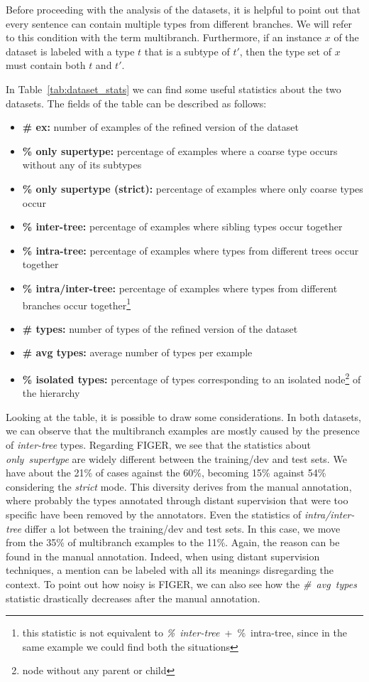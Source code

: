Before proceeding with the analysis of the datasets, it is helpful to point out that every sentence can contain multiple types from different branches. We will refer to this condition with the term multibranch. Furthermore, if an instance $x$ of the dataset is labeled with a type $t$ that is a subtype of $t'$, then the type set of $x$ must contain both $t$ and $t'$.

In Table~\ref{tab:dataset_stats} we can find some useful statistics about the two datasets. The fields of the table can be described as follows:
\begin{itemize}
    \item \textbf{\# ex:} number of examples of the refined version of the dataset
    \item \textbf{\% only supertype:} percentage of examples where a coarse type occurs without any of its subtypes
    \item \textbf{\% only supertype (strict):} percentage of examples where only coarse types occur
    \item \textbf{\% inter-tree:} percentage of examples where sibling types occur together
    \item \textbf{\% intra-tree:} percentage of examples where types from different trees occur together
    \item \textbf{\% intra/inter-tree:} percentage of examples where types from different branches occur together\footnote{this statistic is not equivalent to \textit{\%~inter-tree}~+~\%~intra-tree, since in the same example we could find both the situations}
    \item \textbf{\# types:} number of types of the refined version of the dataset
    \item \textbf{\# avg types:} average number of types per example
    \item \textbf{\% isolated types:} percentage of types corresponding to an isolated node\footnote{node without any parent or child} of the hierarchy
\end{itemize}

Looking at the table, it is possible to draw some considerations. In both datasets, we can observe that the multibranch examples are mostly caused by the presence of \textit{inter-tree} types. Regarding FIGER, we see that the statistics about \textit{only~supertype} are widely different between the training/dev and test sets. We have about the 21\% of cases against the 60\%, becoming 15\% against 54\% considering the \textit{strict} mode. This diversity derives from the manual annotation, where probably the types annotated through distant supervision that were too specific have been removed by the annotators. Even the statistics of \textit{intra/inter-tree} differ a lot between the training/dev and test sets. In this case, we move from the 35\% of multibranch examples to the 11\%. Again, the reason can be found in the manual annotation. Indeed, when using distant supervision techniques, a mention can be labeled with all its meanings disregarding the context. To point out how noisy is FIGER, we can also see how the \textit{\#~avg~types} statistic drastically decreases after the manual annotation.

